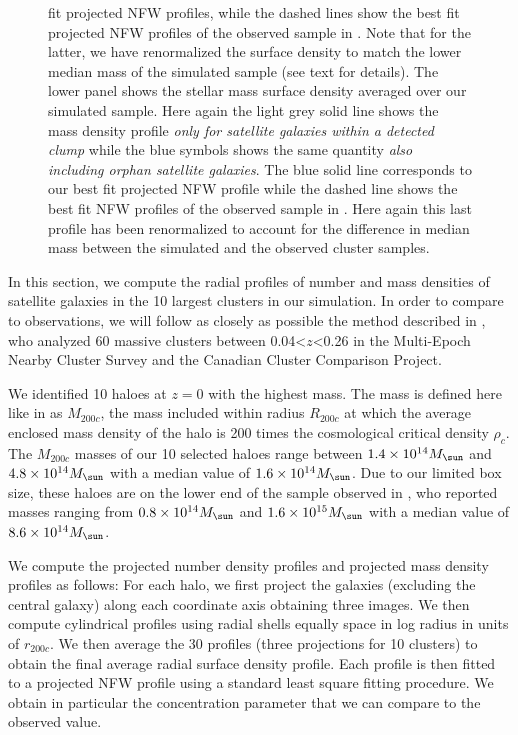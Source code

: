 \begin{figure}
{    fit projected NFW  profiles, while the  dashed lines  show the best  fit 
    projected NFW profiles of the observed sample in
    \citet{vanderburgEvidenceInsideoutGrowth2015}.  Note  that for the
    latter,  we have  renormalized the  surface density  to match  the
    lower median mass of the  simulated sample (see text for details).
    The lower  panel shows the  stellar mass surface  density averaged
    over our  simulated sample. Here  again the light grey  solid line
    shows the  mass density profile  {\it only for  satellite galaxies
      within a detected  clump} while the blue symbols  shows the same
    quantity {\it also including  orphan satellite galaxies}. The blue
    solid  line corresponds  to our  best  fit projected NFW  profile while  the
    dashed line shows the best fit NFW profiles of the observed sample
    in \citet{vanderburgEvidenceInsideoutGrowth2015}.  Here again this
    last profile has  been renormalized to account  for the difference
    in  median mass  between the  simulated and  the observed  cluster
    samples.}
%
  \label{fig:radial-profiles}
\end{figure}

In this  section, we compute  the radial  profiles of number  and mass
densities  of satellite  galaxies in  the 10  largest clusters  in our
simulation. In  order to  compare to observations,  we will  follow as
closely      as     possible      the     method      described     in
\citet{vanderburgEvidenceInsideoutGrowth2015}, who analyzed 60 massive
clusters between 0.04<$z$<0.26 in  the Multi-Epoch Nearby Cluster Survey
and the Canadian Cluster Comparison Project.

We identified 10  haloes at $z=0$ with the highest  mass.  The mass is
defined here like  in \citet{vanderburgEvidenceInsideoutGrowth2015} as
$M_{200c}$, the  mass included within  radius $R_{200c}$ at  which the
average  enclosed  mass   density  of  the  halo  is   200  times  the
cosmological critical density $\rho_c$.   The $M_{200c}$ masses of our
10 selected  haloes range between  $1.4 \times 10^{14}\msol$  and $4.8
\times 10^{14}\msol$ with a median value of $1.6 \times 10^{14}\msol$.
Due to our limited box size, these  haloes are on the lower end of the
sample observed  in \citet{vanderburgEvidenceInsideoutGrowth2015}, who
reported masses ranging from $0.8 \times 10^{14}\msol$ and $1.6 \times
10^{15}\msol$ with a median value of $8.6 \times 10^{14}\msol$.

We compute  the projected number  density profiles and  projected mass
density  profiles as  follows: For  each  halo, we  first project  the
galaxies  (excluding the  central galaxy)  along each  coordinate axis
obtaining three  images.  We  then compute cylindrical  profiles using
radial shells equally space in log  radius in units of $r_{200c}$.  We
then average  the 30 profiles  (three projections for 10 clusters) to
obtain the final average radial surface density profile.  Each profile
is then fitted to a projected NFW profile \citep{navarroStructureColdDark1996b} using a
standard least square fitting procedure.   We obtain in particular the
concentration parameter that we can compare to the observed value.

